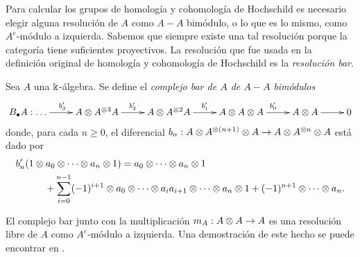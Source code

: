 \documentclass[a4paper,oneside,fleqn,11pt,../tesis.tex]{subfiles}
\begin{document}
Para calcular los grupos de homología y cohomología de Hochschild es necesario elegir alguna resolución de $A$ como $A-A$ bimódulo,
o lo que es lo mismo, como $A^e$-módulo a izquierda. Sabemos que siempre existe una tal resolución porque la categoría tiene suficientes
proyectivos. La resolución que fue usada en la definición original de homología y cohomología de Hochschild es la \emph{resolución bar}.
\begin{definition}
	Sea $A$ una $\Bbbk$-álgebra. Se define el \emph{complejo bar de $A$ de $A-A$ bimódulos}
	\begin{align*}
		\xymatrix{
			B_{\bullet}A:\ldots \ar[r]^{b'_3} &  A \ox A^{\ox 3} A \ar[r]^{b'_2} & A \ox A^{\ox 2} A \ar[r]^{b'_1}
				& A \ox A \ox A \ar[r]^{b'_0} & A \ox A \ar[r] & 0 
		}
	\end{align*}
	donde, para cada $n \geq 0$, el diferencial $b_n: A \otimes A^{\otimes (n + 1)} \otimes A \to A \otimes A^{\otimes n} \otimes A$ está dado por
	\begin{align*}
		b'_n&(1\otimes a_0 \otimes \cdots \otimes a_n \otimes 1) = a_0 \otimes \cdots \otimes a_n \otimes 1 \\
		 & \qquad + \sum_{i = 0}^{n -1}(-1)^{i + 1} \otimes a_0 \otimes \cdots \otimes a_i a_{i + 1} \otimes \cdots \otimes a_n \otimes 1 + (-1)^{n + 1} \otimes \cdots \otimes a_n.
	\end{align*}
\end{definition}
El complejo bar junto con la multiplicación $m_A: A \otimes A \to A$ es una resolución libre de $A$ como $A^e$-módulo a izquierda.
Una demostración de este hecho se puede encontrar en \cite[Capitulo 9]{CE}.
\end{document}
